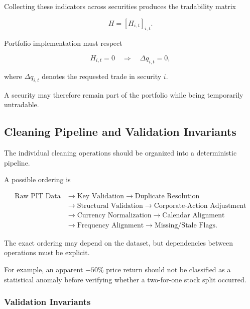 \documentclass[11pt,a4paper]{article}
\begin{document}
Collecting these indicators across securities produces the tradability matrix

\begin{equation}
\boxed{
H
=
\left[
H_{i,t}
\right]_{i,t}.
}
\end{equation}

Portfolio implementation must respect

\begin{equation}
H_{i,t}=0
\quad\Rightarrow\quad
\Delta q_{i,t}=0,
\end{equation}

where $\Delta q_{i,t}$ denotes the requested trade in security $i$.

A security may therefore remain part of the portfolio while being temporarily
untradable.


\subsection{Cleaning Pipeline and Validation Invariants}
\label{subsec:cleaning_pipeline}

The individual cleaning operations should be organized into a deterministic
pipeline.

A possible ordering is

\begin{equation}
\boxed{
\begin{aligned}
\text{Raw PIT Data}
&\rightarrow
\text{Key Validation}
\rightarrow
\text{Duplicate Resolution}
\\[0.1cm]
&\rightarrow
\text{Structural Validation}
\rightarrow
\text{Corporate-Action Adjustment}
\\[0.1cm]
&\rightarrow
\text{Currency Normalization}
\rightarrow
\text{Calendar Alignment}
\\[0.1cm]
&\rightarrow
\text{Frequency Alignment}
\rightarrow
\text{Missing/Stale Flags}.
\end{aligned}
}
\end{equation}

The exact ordering may depend on the dataset, but dependencies between
operations must be explicit.

For example, an apparent $-50\%$ price return should not be classified as a
statistical anomaly before verifying whether a two-for-one stock split occurred.


\subsubsection{Validation Invariants}
\end{document}

